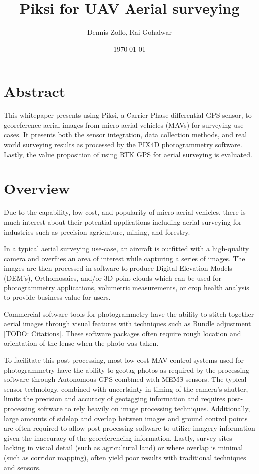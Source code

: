 \documentclass{article}
\title{Piksi for UAV Aerial surveying}
\author{Dennis Zollo, Rai Gohalwar}
\date{\today}
\begin{document}
\maketitle

\thispagestyle{firstpage}

\section{Abstract}
\label{sec:abstract}
This whitepaper presents using Piksi, a Carrier Phase differential GPS sensor, to georeference aerial images from micro aerial vehicles (MAVs) for surveying use cases.
It presents both the sensor integration, data collection methods, and real world surveying results as processed by the PIX4D photogrammetry software.  Lastly, the value proposition of using RTK GPS for aerial surveying is evaluated.
\tableofcontents
\newpage
\section{Overview}
\label{sec:Overview}
Due to the capability, low-cost, and popularity of micro aerial vehicles, there is much interest about their potential applications including aerial surveying for industries such as precision agriculture, mining, and forestry.

In a typical aerial surveying use-case, an aircraft is outfitted with a high-quality camera and overflies an area of interest while capturing a series of images.  The images are then processed in software to produce Digital Elevation Models (DEM's), Orthomosaics, and/or 3D point clouds which can be used for photogrammetry applications, volumetric measurements, or crop health analysis to provide business value for users.

Commercial software tools for photogrammetry have the ability to stitch together aerial images through visual features with techniques such as Bundle adjustment [TODO: Citations].  These software packages often require rough location and orientation of the lense when the photo was taken.

To facilitate this post-processing, most low-cost MAV control systems used for photogrammetry have the ability to geotag photos as required by the processing software through Autonomous GPS combined with MEMS sensors.  The typical sensor technology, combined with uncertainty in timing of the camera's shutter, limits the precision and accuracy of geotagging information and requires post-processing software to rely heavily on image processing techniques. Additionally, large amounts of sidelap and overlap between images and ground control points are often required to allow post-processing software to utilize imagery information given the inaccuracy of the georeferencing information.  Lastly, survey sites lacking in visual detail (such as agricultural land) or where overlap is minimal (such as corridor mapping), often yield poor results with traditional techniques and sensors.
\end{document}
